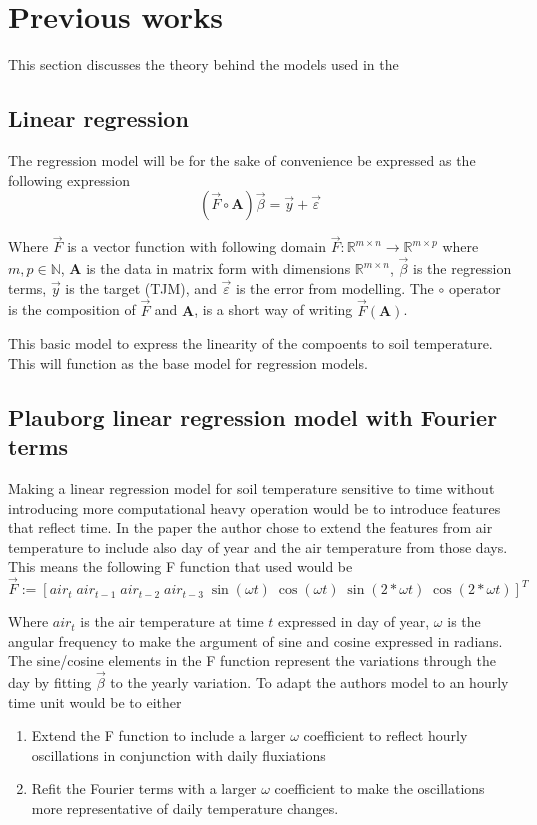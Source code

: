 \section{Previous works}\label{sec:theory}

This section discusses the theory behind the models used in the 

\subsection{Linear regression}

The regression model will be for the sake of convenience be expressed as the following expression
$$
\left(\vec{F}\circ \mathbf{A}\right)\vec{\beta}=\vec{y}+\vec{\varepsilon}
$$

Where $\vec{F}$ is a vector function with following domain $\vec{F}:\mathbb{R}^{m\times n}\to \mathbb{R}^{m\times p}$ where $m,p\in \mathbb{N}$, $\mathbf{A}$ is the data in matrix form with dimensions $\mathbb{R}^{m\times n}$, $\vec{\beta}$ is the regression terms, $\vec{y}$ is the target (TJM), and $\vec{\varepsilon}$ is the error from modelling. The $\circ$ operator is the composition of $\vec{F}$ and $\mathbf{A}$, is a short way of writing $\vec{F}(\mathbf{A})$.

This basic model to express the linearity of the compoents to soil temperature. This will function as the base model for regression models. 
\subsection[Plauborg Regression]{Plauborg linear regression model with Fourier terms}\cite{plauborg_simple_2002}

Making a linear regression model for soil temperature sensitive to time without introducing more computational heavy operation would be to introduce features that reflect time. In the paper  the author chose to extend the features from air temperature to include also day of year and the air temperature from those days. This means the following F function that \citeauthor{plauborg_simple_2002} used would be 
$$
\vec{F} := [air_t \; air_{t-1}\; air_{t-2}\; air_{t-3}\; \sin(\omega t) \; \cos(\omega t)\; \sin(2*\omega t)\; \cos(2*\omega t)]^T
$$

Where $air_t$ is the air temperature at time $t$ expressed in day of year, $\omega$ is the angular frequency to make the argument of sine and cosine expressed in radians. The sine/cosine elements in the F function represent the variations through the day by fitting $\vec{\beta}$ to the yearly variation. To adapt the authors model to an hourly time unit would be to either
\begin{enumerate}
	\item Extend the F function to include a larger $\omega$ coefficient to reflect hourly oscillations in conjunction with daily fluxiations
	\item Refit the Fourier terms with a larger $\omega$ coefficient to make the oscillations more representative of daily temperature changes.
\end{enumerate}

